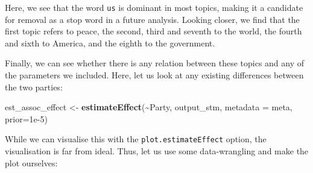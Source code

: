 \documentclass[
]{book}
\newenvironment{Shaded}{\begin{snugshade}}{\end{snugshade}}
\newcommand{\AttributeTok}[1]{\textcolor[rgb]{0.13,0.29,0.53}{#1}}
\newcommand{\FloatTok}[1]{\textcolor[rgb]{0.00,0.00,0.81}{#1}}
\newcommand{\FunctionTok}[1]{\textcolor[rgb]{0.13,0.29,0.53}{\textbf{#1}}}
\newcommand{\NormalTok}[1]{#1}
\newcommand{\OtherTok}[1]{\textcolor[rgb]{0.56,0.35,0.01}{#1}}
\newcommand{\SpecialCharTok}[1]{\textcolor[rgb]{0.81,0.36,0.00}{\textbf{#1}}}
\begin{document}
Here, we see that the word \texttt{us} is dominant in most topics, making it a candidate for removal as a stop word in a future analysis. Looking closer, we find that the first topic refers to peace, the second, third and seventh to the world, the fourth and sixth to America, and the eighth to the government.

Finally, we can see whether there is any relation between these topics and any of the parameters we included. Here, let us look at any existing differences between the two parties:

\begin{Shaded}
\begin{Highlighting}[]
\NormalTok{est\_assoc\_effect }\OtherTok{\textless{}{-}} \FunctionTok{estimateEffect}\NormalTok{(}\SpecialCharTok{\textasciitilde{}}\NormalTok{Party, output\_stm, }\AttributeTok{metadata =}\NormalTok{ meta, }\AttributeTok{prior=}\FloatTok{1e{-}5}\NormalTok{)}
\end{Highlighting}
\end{Shaded}

While we can visualise this with the \texttt{plot.estimateEffect} option, the visualisation is far from ideal. Thus, let us use some data-wrangling and make the plot ourselves:
\end{document}
